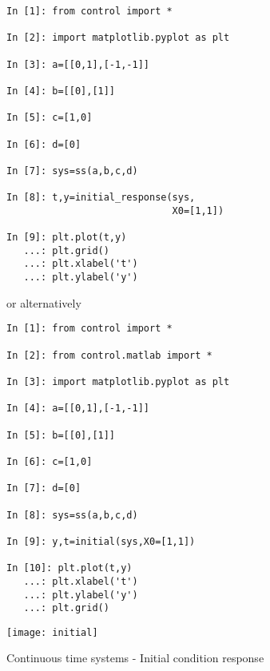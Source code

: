 \begin{figure}[htbp]	%
\begin{minipage}[t]{0.55\textwidth}
  \vspace{0pt}
\begin{lstlisting}[linewidth=7cm,xleftmargin=0cm]
In [1]: from control import *

In [2]: import matplotlib.pyplot as plt

In [3]: a=[[0,1],[-1,-1]]

In [4]: b=[[0],[1]]

In [5]: c=[1,0]

In [6]: d=[0]

In [7]: sys=ss(a,b,c,d)

In [8]: t,y=initial_response(sys,
                             X0=[1,1])

In [9]: plt.plot(t,y)
   ...: plt.grid()
   ...: plt.xlabel('t')
   ...: plt.ylabel('y')
\end{lstlisting}

or alternatively

\begin{lstlisting}[linewidth=7cm,xleftmargin=0cm]
In [1]: from control import *

In [2]: from control.matlab import *

In [3]: import matplotlib.pyplot as plt

In [4]: a=[[0,1],[-1,-1]]

In [5]: b=[[0],[1]]

In [6]: c=[1,0]

In [7]: d=[0]

In [8]: sys=ss(a,b,c,d)

In [9]: y,t=initial(sys,X0=[1,1])

In [10]: plt.plot(t,y)
   ...: plt.xlabel('t')
   ...: plt.ylabel('y')
   ...: plt.grid()
\end{lstlisting}
\end{minipage}%
\begin{minipage}[t]{0.5\textwidth}
  \vspace{0pt} \centering
  \texttt{[image: initial]}
\end{minipage}
\caption{Continuous time systems - Initial condition response}
\label{F3}
\end{figure}

